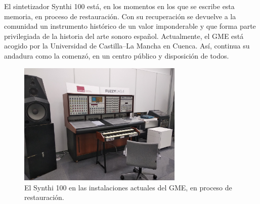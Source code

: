 El sintetizador Synthi 100 está, en los momentos en los que se escribe esta memoria, en proceso de restauración. Con su recuperación se devuelve a la comunidad un instrumento histórico de un valor imponderable y que forma parte privilegiada de la historia del arte sonoro español. Actualmente, el GME está acogido por la Universidad de Castilla--La Mancha en Cuenca. Así, continua su andadura como la comenzó, en un centro público y disposición de todos.

\begin{figure}
	\centering
	\includegraphics[width=0.7\textwidth]{synthi_GME_2020}
	\caption[El Synthi 100 en las instalaciones actuales del GME.]{El Synthi 100 en las instalaciones actuales del GME, en proceso de restauración.}
	\label{fig:synthi_GME_2020}
\end{figure}



